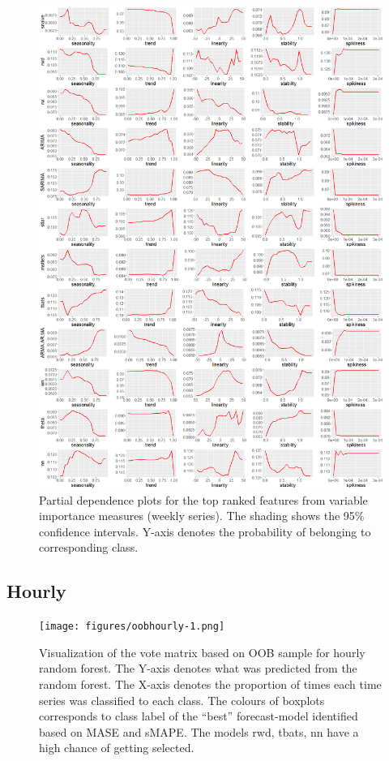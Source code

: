\documentclass[11pt,a4paper,]{article}
\begin{document}
\newpage

\begin{figure}
\centering
\includegraphics{figures/weeklypdp-1.png}
\caption{\label{fig:weeklypdp}Partial dependence plots for the top ranked
features from variable importance measures (weekly series). The shading
shows the 95\% confidence intervals. Y-axis denotes the probability of
belonging to corresponding class.}
\end{figure}

\subsection{Hourly}\label{hourly}

\begin{figure}
\centering
\texttt{[image: figures/oobhourly-1.png]}
\caption{\label{fig:oobhourly}Visualization of the vote matrix based on OOB
sample for hourly random forest. The Y-axis denotes what was predicted
from the random forest. The X-axis denotes the proportion of times each
time series was classified to each class. The colours of boxplots
corresponds to class label of the ``best'' forecast-model identified
based on MASE and sMAPE. The models rwd, tbats, nn have a high chance of
getting selected.}
\end{figure}
\end{document}
